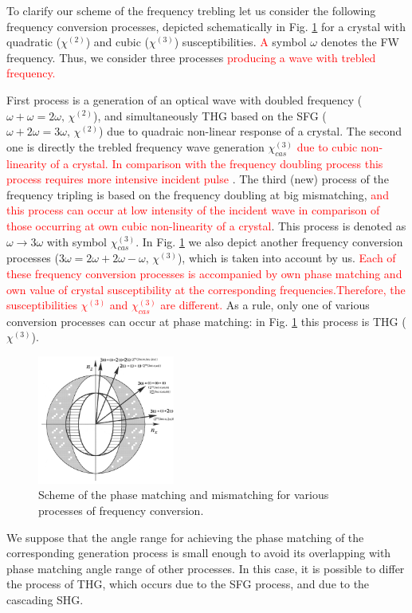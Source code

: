 \documentclass[a4paper, 12pt, onecolumn]{extarticle}
\begin{document}
To clarify our scheme of the frequency trebling let us consider the following frequency conversion processes, depicted schematically in Fig. \ref{fr:match} for a crystal with quadratic (\(\chi^{(2)}\)) and cubic (\(\chi^{(3)}\))  susceptibilities. \textcolor{red}{A}  symbol \(\omega\) denotes  the FW frequency. 
Thus, we consider three processes \textcolor{red}{producing a wave with trebled frequency.} 

First process is a generation of an optical wave with doubled frequency (\(\omega+\omega=2\omega,\,\chi^{(2)}\)), and simultaneously THG based on the SFG (\(\omega+2\omega=3\omega,\,\chi^{(2)}\)) due to quadraic non-linear response of a crystal. The second one is directly the trebled frequency wave generation \(\chi^{(3)}_{cas}\) \textcolor{red}{ due to cubic non-linearity of a crystal. In comparison with the frequency doubling process this process requires  more intensive  incident pulse }. The third (new) process of the frequency tripling is based on the frequency doubling at big mismatching, \textcolor{red}{and this process can occur at low intensity of the incident wave in comparison of those occurring at own cubic non-linearity of a crystal}. This process is denoted as \(\omega\rightarrow3\omega\) with symbol \(\chi^{(3)}_{cas}\).   In Fig. \ref{fr:match} we also depict another frequency conversion processes (\(3\omega=2\omega+2\omega-\omega,\,\chi^{(3)}\)), which is taken into account by us. \textcolor{red}{Each of these frequency conversion processes is accompanied by own phase matching and own value of crystal susceptibility at the corresponding frequencies.Therefore, the susceptibilities \(\chi^{(3)}\) and  \(\chi^{(3)}_{cas}\) are different.} As a rule, only one of various conversion processes can occur at phase matching: in Fig. \ref{fr:match} this process is THG ($\chi^{(3)}$).
\begin{figure}[h!]
\centering
\includegraphics[width=0.4\textwidth]{Matching2}
\caption{Scheme of the phase matching and mismatching for various processes of frequency conversion.}
\label{fr:match}
\end{figure}
We suppose that the angle range for achieving the phase matching of the corresponding generation process is small enough to avoid its overlapping with phase matching angle range of other processes. In this case, it is possible to differ the process of THG, which occurs due to the SFG process, and due to the cascading SHG.
\end{document}
